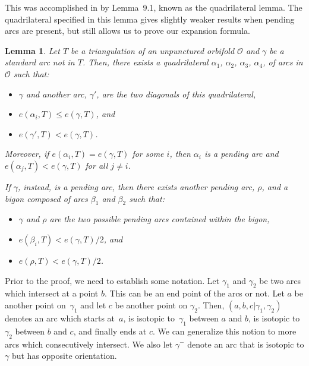 \documentclass[pdftex]{sigma}%
\newcommand{\Orb}{\mathcal{O}}
\numberwithin{equation}{section}
\newtheorem{Lemma}[Theorem]{Lemma}
\begin{document}
This was accomplished in \cite{MSW} by Lemma~9.1, known as the quadrilateral lemma. The quadrilateral specified in this lemma gives slightly weaker results when pending arcs are present, but still allows us to prove our expansion formula.

\begin{Lemma}\label{lem:QuadAndBigon}
Let $T$ be a triangulation of an unpunctured orbifold $\mathcal{O}$ and $\gamma$ be a standard arc not in $T$. Then, there exists a quadrilateral $\alpha_1$, $\alpha_2$, $\alpha_3$, $\alpha_4$, of arcs in $\Orb$ such that:
\begin{itemize}\itemsep=0pt
\item $\gamma$ and another arc, $\gamma'$, are the two diagonals of this quadrilateral,
\item $e(\alpha_i, T) \leq e(\gamma, T)$, and
\item $e(\gamma', T) < e(\gamma, T)$.
\end{itemize}

Moreover, if $e(\alpha_i,T) = e(\gamma,T)$ for some $i$, then $\alpha_i$ is a pending arc and ${e(\alpha_j,T) < e(\gamma,T)}$ for all $j \neq i$.

If $\gamma$, instead, is a pending arc, then there exists another pending arc, $\rho$, and a bigon composed of arcs $\beta_1$ and $\beta_2$ such that:
\begin{itemize}\itemsep=0pt
\item $\gamma$ and $\rho$ are the two possible pending arcs contained within the bigon,
\item $e(\beta_i, T) < e(\gamma, T)/2$, and
\item $e(\rho, T) < e(\gamma, T)/2$.
\end{itemize}
\end{Lemma}

Prior to the proof, we need to establish some notation. Let $\gamma_1$ and $\gamma_2$ be two arcs which intersect at a point $b$. This can be an end point of the arcs or not. Let $a$ be another point on~$\gamma_1$ and let $c$ be another point on $\gamma_2$. Then, $(a,b, c\vert \gamma_1,\gamma_2)$ denotes an arc which starts at~$a$, is isotopic to~$\gamma_1$ between $a$ and $b$, is isotopic to $\gamma_2$ between $b$ and $c$, and finally ends at $c$. We can generalize this notion to more arcs which consecutively intersect. We also let $\gamma^-$ denote an arc that is isotopic to $\gamma$ but has opposite orientation.
\end{document}
